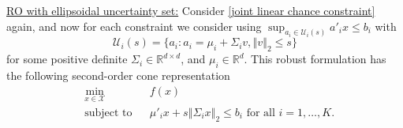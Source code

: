 \documentclass[mnsc,blindrev]{informs4} %
\newcommand{\R}{\mathbb{R}}
\newcommand{\norm}[1]{\left \Vert #1 \right\Vert}
\begin{document}
\smallskip





\noindent\underline{RO with ellipsoidal uncertainty set:}
Consider \eqref{joint linear chance constraint} again, and now for each constraint we consider using $\sup_{a_i\in\mathcal U_i(s)}a'_ix\leq b_i$ with
\begin{equation*}
\mathcal U_i(s)=\{a_i:a_i=\mu_i+\Sigma_iv,\norm{v}_2\leq s\}
\end{equation*}
for some positive definite $\Sigma_i\in \R^{d\times d}$, and $\mu_i\in\R^d$. This robust formulation has the following second-order cone representation
\begin{equation}\label{RO ellipsoid chance constraint}
\begin{aligned}
    &\min_{x\in\mathcal X}&&f(x)\\
    &\text{subject to}&&\mu'_ix+s\norm{\Sigma_ix}_2\leq b_i\text{\ \ for all }i=1,\ldots,K.
\end{aligned}
\end{equation}
\end{document}
